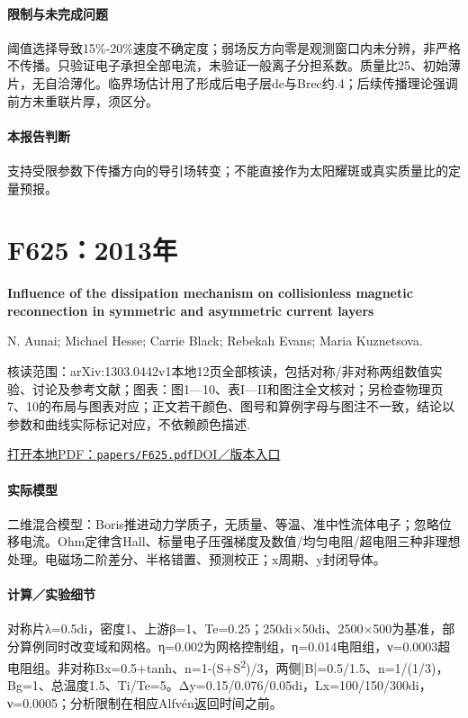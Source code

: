 \paragraph{限制与未完成问题}阈值选择导致15\%-20\%速度不确定度；弱场反方向零是观测窗口内未分辨，非严格不传播。只验证电子承担全部电流，未验证一般离子分担系数。质量比25、初始薄片，无自洽薄化。临界场估计用了形成后电子层de与Brec约.4；后续传播理论强调前方未重联片厚，须区分。

\paragraph{本报告判断}支持受限参数下传播方向的导引场转变；不能直接作为太阳耀斑或真实质量比的定量预报。

\section{F625：2013年}\label{paper:F625}

\textbf{Influence of the dissipation mechanism on collisionless magnetic reconnection in symmetric and asymmetric current layers}\citep{F625}\

N. Aunai;  Michael Hesse;  Carrie Black;  Rebekah Evans;  Maria Kuznetsova.

\textsf{核读范围：}arXiv:1303.0442v1本地12页全部核读，包括对称/非对称两组数值实验、讨论及参考文献；\textsf{图表：}图1—10、表I—II和图注全文核对；另检查物理页7、10的布局与图表对应；正文若干颜色、图号和算例字母与图注不一致，结论以参数和曲线实际标记对应，不依赖颜色描述.

\href{run:papers/F625.pdf}{打开本地PDF：\texttt{papers/F625.pdf}}\quad\href{https://doi.org/10.1063/1.4795727}{DOI／版本入口}

\paragraph{实际模型}二维混合模型：Boris推进动力学质子，无质量、等温、准中性流体电子；忽略位移电流。Ohm定律含Hall、标量电子压强梯度及数值/均匀电阻/超电阻三种非理想处理。电磁场二阶差分、半格错置、预测校正；x周期、y封闭导体。

\paragraph{计算／实验细节}对称片λ=0.5di，密度1、上游β=1、Te=0.25；250di×50di、2500×500为基准，部分算例同时改变域和网格。η=0.002为网格控制组，η=0.014电阻组，ν=0.0003超电阻组。非对称Bx=0.5+tanh、n=1-(S+S\textsuperscript{2})/3，两侧|B|=0.5/1.5、n=1/(1/3)，Bg=1、总温度1.5、Ti/Te=5。Δy=0.15/0.076/0.05di，Lx=100/150/300di，ν=0.0005；分析限制在相应Alfvén返回时间之前。

